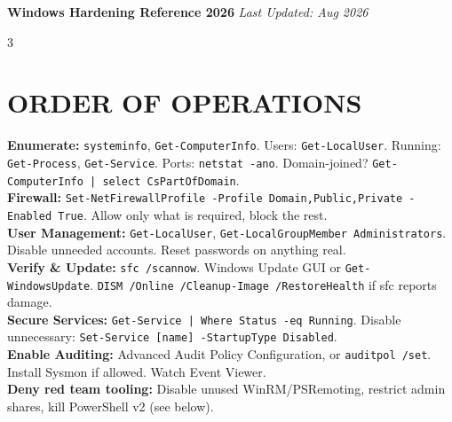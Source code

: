 \documentclass[7pt,landscape]{article}
\begin{document}
\textbf{\textcolor{winc}{Windows} Hardening Reference 2026} \hfill \textit{Last Updated: Aug 2026}
\raggedcolumns
\begin{multicols*}{3}

\section{ORDER OF OPERATIONS}
\textbf{Enumerate:} \texttt{systeminfo}, \texttt{Get-ComputerInfo}. Users: \texttt{Get-LocalUser}. Running: \texttt{Get-Process}, \texttt{Get-Service}. Ports: \texttt{netstat -ano}. Domain-joined? \texttt{Get-ComputerInfo | select CsPartOfDomain}. \\
\textbf{Firewall:} \texttt{Set-NetFirewallProfile -Profile Domain,Public,Private -Enabled True}. Allow only what is required, block the rest. \\
\textbf{User Management:} \texttt{Get-LocalUser}, \texttt{Get-LocalGroupMember Administrators}. Disable unneeded accounts. Reset passwords on anything real. \\
\textbf{Verify \& Update:} \texttt{sfc /scannow}. Windows Update GUI or \texttt{Get-WindowsUpdate}. \texttt{DISM /Online /Cleanup-Image /RestoreHealth} if sfc reports damage. \\
\textbf{Secure Services:} \texttt{Get-Service | Where Status -eq Running}. Disable unnecessary: \texttt{Set-Service [name] -StartupType Disabled}. \\
\textbf{Enable Auditing:} Advanced Audit Policy Configuration, or \texttt{auditpol /set}. Install Sysmon if allowed. Watch Event Viewer. \\
\textbf{Deny red team tooling:} Disable unused WinRM/PSRemoting, restrict admin shares, kill PowerShell v2 (see below).


\end{multicols*}
\end{document}
